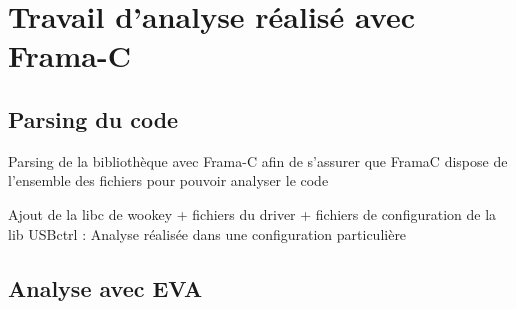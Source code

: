 \documentclass[french]{beamer}
\begin{document}

 \section[Analyse du code]{Travail d'analyse réalisé avec Frama-C}

 \subsection{Parsing du code}

 \begin{frame}

 \justifyit Parsing de la bibliothèque avec Frama-C afin de s'assurer que FramaC dispose de l'ensemble des fichiers pour pouvoir analyser le code

 \bigskip

 \justifyit Ajout de la libc de wookey + fichiers du driver + fichiers de configuration de la lib USBctrl : Analyse réalisée dans une configuration particulière


 \end{frame}

 \subsection{Analyse avec EVA}
\end{document}
